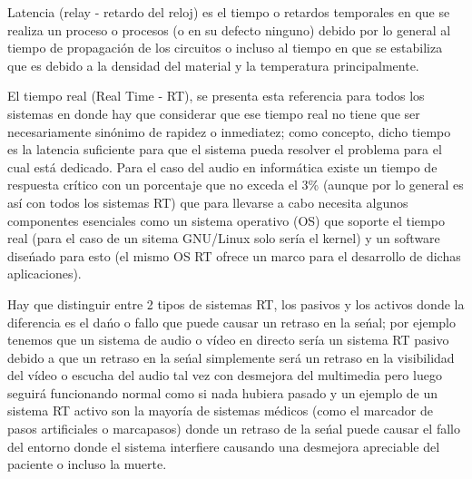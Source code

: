 \begin{multicols}{2}
Latencia (relay - retardo del reloj) es el tiempo o retardos temporales en que se realiza un proceso o procesos (o en su defecto ninguno) debido por lo general al tiempo de propagación de los circuitos o incluso al tiempo en que se estabiliza que es debido a la densidad del material y la temperatura principalmente.

\begin{center}
\end{center}





\begin{center}
\end{center}

El tiempo real (Real Time - RT), se presenta esta referencia para todos los sistemas en donde hay que considerar que ese tiempo real no tiene que ser necesariamente sinónimo de rapidez o inmediatez; como concepto, dicho tiempo es la latencia suficiente para que el sistema pueda resolver el problema para el cual está dedicado. Para el caso del audio en informática existe un tiempo de respuesta crítico con un porcentaje que no exceda el 3\% (aunque por lo general es así con todos los sistemas RT) que para llevarse a cabo necesita algunos componentes esenciales como un sistema operativo (OS) que soporte el tiempo real (para el caso de un sitema GNU/Linux solo sería el kernel) y un software diseńado para esto (el mismo OS RT ofrece un marco para el desarrollo de dichas aplicaciones).

Hay que distinguir entre 2 tipos de sistemas RT, los pasivos y los activos donde la diferencia es el dańo o fallo que puede causar un retraso en la seńal; por ejemplo tenemos que un sistema de audio o vídeo en directo sería un sistema RT pasivo debido a que un retraso en la seńal simplemente será un retraso en la visibilidad del vídeo o escucha del audio tal vez con desmejora del multimedia pero luego seguirá funcionando normal como si nada hubiera pasado y un ejemplo de un sistema RT activo son la mayoría de sistemas médicos (como el marcador de pasos artificiales o marcapasos) donde un retraso de la seńal puede causar el fallo del entorno donde el sistema interfiere causando una desmejora apreciable del paciente o incluso la muerte.


\end{multicols}
